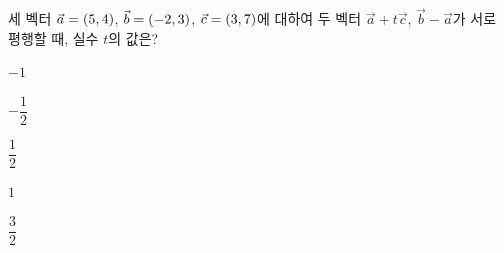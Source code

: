 세 벡터 $\vec{a}=(5{,}\mkern3mu\mathopen{}4)$, $\vec{b}=(-2{,}\mkern3mu\mathopen{}3)$, $\vec{c}=(3{,}\mkern3mu\mathopen{}7)$에 대하여 두 벡터 $\vec{a}+t\vec{c}$, $\vec{b}-\vec{a}$가 서로 평행할 때, 실수 $t$의 값은?
\begin{choices32}{\rule[-3ex]{0pt}{8ex}$-1$}{\rule[-3ex]{0pt}{8ex}$-\dfrac{1}{2}$}{\rule[-3ex]{0pt}{8ex}$\dfrac{1}{2}$}{\rule[-3ex]{0pt}{8ex}$1$}{\rule[-3ex]{0pt}{8ex}$\dfrac{3}{2}$}\end{choices32}

